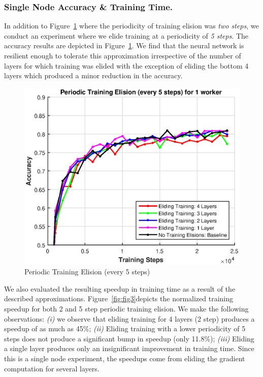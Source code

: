 \subsubsection{Single Node Accuracy \& Training Time.}
In addition to Figure~\ref{fig:fig2} where the periodicity of training elision was \emph{two steps}, we conduct an experiment where we elide training at a periodicity of \emph{5 steps}. The accuracy results are depicted in Figure~\ref{fig:fig2}. We find that the neural network is resilient enough to tolerate this approximation irrespective of the number of layers for which training was elided with the exception of eliding the bottom 4 layers which produced a minor reduction in the accuracy. 
\begin{figure}[t]
	\centering
	\includegraphics[width=0.8\columnwidth]{figures/fig2.eps}
	\caption{Periodic Training Elision (every 5 steps)}
	\label{fig:fig2}
\end{figure}
We also evaluated the resulting speedup in training time as a result of the described approximations. Figure~\ref{fig:fig3}depicts the normalized training speedup for both 2 and 5 step periodic training elision. We make the following observations: \emph{(i)} we observe that eliding training for 4 layers (2 step) produces a speedup of as much as 45\%; \emph{(ii)} Eliding training with a lower periodicity of 5 steps does not produce a significant bump in speedup (only 11.8\%); \emph{(iii)} Eliding a single layer produces only an insignificant improvement in training time. Since this is a single node experiment, the speedups come from eliding the gradient computation for several layers.  
